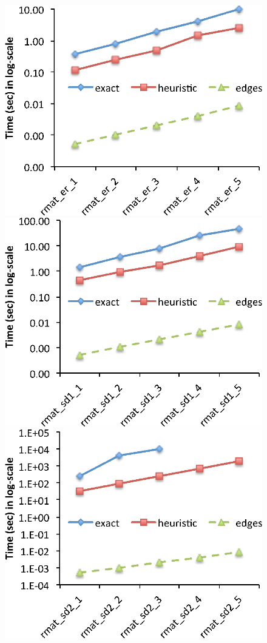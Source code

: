 \begin{figure}
  \centering
    \includegraphics[scale=0.6]{compare_time_er.eps}
    \includegraphics[scale=0.6]{compare_time_sd1.eps}
    \includegraphics[scale=0.6]{compare_time_sd2.eps}

\end{figure}
